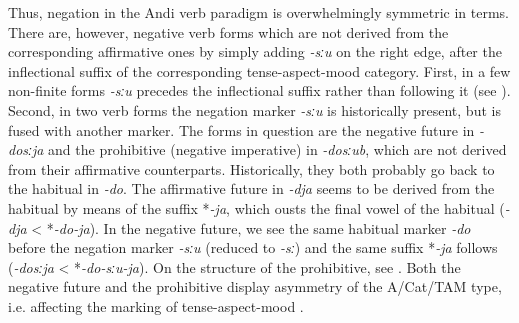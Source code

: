 \documentclass[output=paper,colorlinks=true, citecolor=brown]{langscibook}
\begin{document}
Thus, negation in the Andi verb paradigm is overwhelmingly symmetric in  terms.  There are, however, negative verb forms which are not derived from the corresponding affirmative ones by simply adding \textit{{}-sːu} on the right edge, after the inflectional suffix of the corresponding tense-aspect-mood category. First, in a few non-finite forms \textit{{}-sːu} precedes the inflectional suffix rather than following it (see ). Second, in two verb forms the negation marker \textit{{}-sːu} is historically present, but is fused with another marker. The forms in question are the negative future in \textit{-dosːja} and the prohibitive (negative imperative) in \textit{\nobreakdash-dosːub}, which are not derived from their affirmative counterparts. Historically, they both probably go back to the habitual in \textit{\nobreakdash-do}. The affirmative future in \textit{{}-dja} seems to be derived from the habitual by means of the suffix *\textit{{}-ja}, which ousts the final vowel of the habitual (\textit{{}-dja} < *\textit{{}-do-ja}). In the negative future, we see the same habitual marker \textit{\nobreakdash-do} before the negation marker \textit{{}-sːu} (reduced to \textit{{}-sː}) and the same suffix *\textit{{}-ja} follows (\textit{{}-dosːja} < *\textit{{}-do-sːu{}-ja}). On the structure of the prohibitive, see . Both the negative future and the prohibitive display asymmetry of the \mbox{A/Cat/TAM} type, i.e. affecting the marking of tense-aspect-mood \citep[116]{Miestamo2005}.
\end{document}
